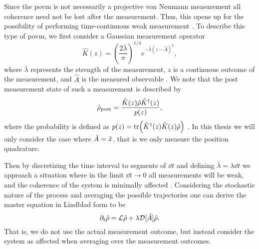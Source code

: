Since the \gls{povm} is not necessarily a projective von Neumann measurement all coherence need not be lost after the measurement. Thus, this opens up for the possibility of performing time-continuous weak measurement \cite{Annby-Andersson:2024}. To describe this type of \gls{povm}, we first consider a Gaussian measurement operator
\begin{equation}
    \hat{K}(z) = \left(\frac{2 \bar{\lambda}}{\pi}\right)^{1/4} e^{-\bar{\lambda}(z - \hat{A})^2},
\end{equation}
where $\bar{\lambda}$ represents the strength of the measurement, $z$ is a continuous outcome of the measurement, and $\hat{A}$ is the measured observable \cite{Annby-Andersson:2024}. We note that the post measurement state of such a measurement is described by
\begin{equation}
    \hat{\rho}_\mathrm{post} =  \frac{\hat{K}(z) \hat{\rho} \hat{K}^\dagger(z)}{p(z)},
\end{equation}
where the probability is defined as $p(z) = \tr( \hat{K}^\dagger(z) \hat{K}(z) \hat{\rho} )$ \cite{Annby-Andersson:2024}. In this thesis we will only consider the case where $\hat{A} = \hat{x}$, that is we only measure the position quadrature.

Then by discretizing the time interval to segments of $\dd t$ and defining $\bar{\lambda} = \lambda \dd t$ we approach a situation where in the limit $\dd t \to 0$ all measurements will be weak, and the coherence of the system is minimally affected \cite{Annby-Andersson:2024}. Considering the stochastic nature of the process and averaging the possible trajectories one can derive the master equation \cite{Annby-Andersson:2024} in Lindblad form to be 
\begin{equation}
    \partial_t\hat{\rho} = \mathcal{L}\hat{\rho} + \lambda \mathcal{D}[\hat{A}] \hat{\rho}. \label{eq:masterMeas}
\end{equation}
That is, we do not use the actual measurement outcome, but instead consider the system as affected when averaging over the measurement outcomes.

